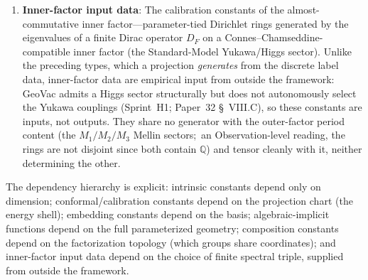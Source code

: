\documentclass[aps,pra,twocolumn,superscriptaddress,longbibliography]{revtex4-2}
\begin{document}
\begin{enumerate}
  \item \textbf{Inner-factor input data}: The calibration constants of
    the almost-commutative inner factor---parameter-tied Dirichlet
    rings generated by the eigenvalues of a finite Dirac operator
    $D_F$ on a Connes--Chamseddine-compatible inner factor (the
    Standard-Model Yukawa/Higgs sector).  Unlike the preceding types,
    which a projection \emph{generates} from the discrete label data,
    inner-factor data are empirical input from outside the framework:
    GeoVac admits a Higgs sector structurally but does not
    autonomously select the Yukawa couplings (Sprint~H1; Paper~32
    \S~VIII.C), so these constants are inputs, not outputs.  They share no
    generator with the outer-factor period content (the
    $M_1/M_2/M_3$ Mellin sectors;\ an Observation-level reading, the
    rings are not disjoint since both contain $\mathbb{Q}$) and tensor
    cleanly with it, neither
    determining the other.
\end{enumerate}

The dependency hierarchy is explicit: intrinsic constants depend
only on dimension; conformal/calibration constants depend on the
projection chart (the energy shell); embedding constants depend on the basis; algebraic-implicit
functions depend on the full parameterized geometry; composition
constants depend on the factorization topology (which groups share
coordinates); and inner-factor input data depend on the choice of
finite spectral triple, supplied from outside the framework.
\end{document}

